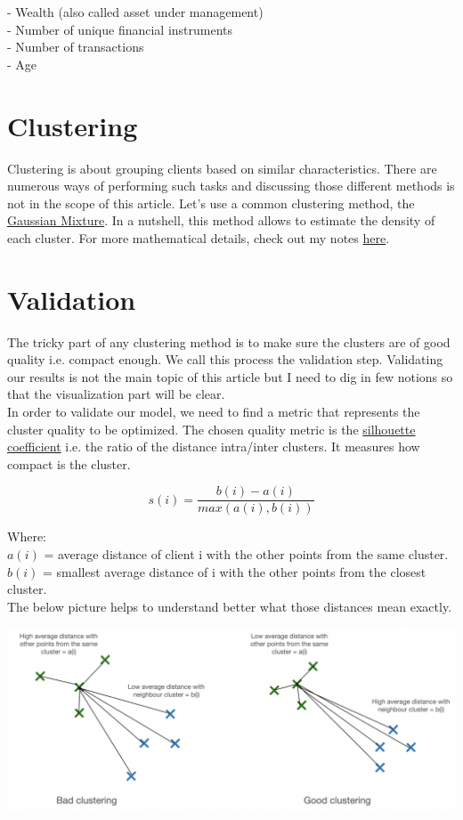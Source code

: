 - Wealth (also called asset under management) \\
- Number of unique financial instruments \\
- Number of transactions \\
- Age

\section{Clustering}

Clustering is about grouping clients based on similar characteristics. There are numerous ways of performing such tasks and discussing those different methods is not in the scope of this article. Let's use a common clustering method, the \href{https://en.wikipedia.org/wiki/Mixture_model}{Gaussian Mixture}. In a nutshell, this method allows to estimate the density of each cluster. For more mathematical details, check out my notes \href{https://savoga.github.io/machinelearning/gmm/}{here}.

\section{Validation}

The tricky part of any clustering method is to make sure the clusters are of good quality i.e. compact enough. We call this process the validation step. Validating our results is not the main topic of this article but I need to dig in few notions so that the visualization part will be clear. \\
In order to validate our model, we need to find a metric that represents the cluster quality to be optimized.
The chosen quality metric is the \href{https://en.wikipedia.org/wiki/Silhouette_(clustering)}{silhouette coefficient} i.e. the ratio of the distance intra/inter clusters. It measures how compact is the cluster. 

$$s(i) = \frac{b(i)-a(i)}{max(a(i),b(i))}$$

Where: \\
$a(i)$ = average distance of client i with the other points from the same cluster. \\
$b(i)$ = smallest average distance of i with the other points from the closest cluster. \\

The below picture helps to understand better what those distances mean exactly. 

\begin{center}
\includegraphics[scale=0.5]{./../img/silhouette-explanations.png}
\end{center}

